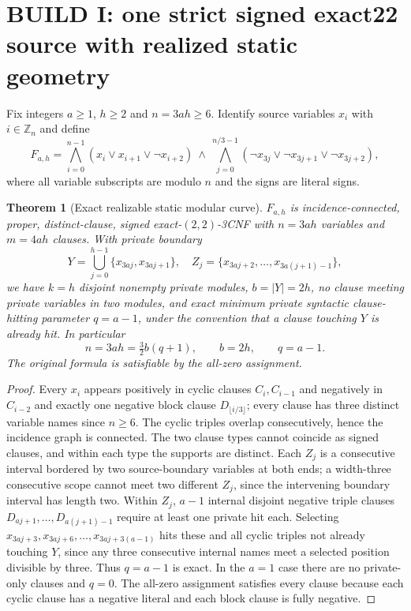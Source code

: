 \documentclass[10pt]{article}
\newtheorem{theorem}{Theorem}
\begin{document}
\section{BUILD I: one strict signed exact22 source with realized static geometry}
Fix integers $a\ge1$, $h\ge2$ and $n=3ah\ge6$. Identify source variables $x_i$ with $i\in\mathbb Z_n$ and define
\begin{equation}\label{eq:source}
F_{a,h}=\bigwedge_{i=0}^{n-1}(x_i\vee x_{i+1}\vee\neg x_{i+2})\ \wedge\
\bigwedge_{j=0}^{n/3-1}(\neg x_{3j}\vee\neg x_{3j+1}\vee\neg x_{3j+2}),
\end{equation}
where all variable subscripts are modulo $n$ and the signs are literal signs.
\begin{theorem}[Exact realizable static modular curve]\label{thm:static}
$F_{a,h}$ is incidence-connected, proper, distinct-clause, signed exact-$(2,2)$-3CNF with $n=3ah$ variables and $m=4ah$ clauses. With private boundary
\[
 Y=\bigcup_{j=0}^{h-1}\{x_{3aj},x_{3aj+1}\},\quad
 Z_j=\{x_{3aj+2},\ldots,x_{3a(j+1)-1}\},
\]
we have $k=h$ disjoint nonempty private modules, $b=|Y|=2h$, no clause meeting private variables in two modules, and exact minimum private syntactic clause-hitting parameter $q=a-1$, under the convention that a clause touching $Y$ is already hit. In particular
\begin{equation}\label{eq:realizable}
 n=3ah=\tfrac32b(q+1),\qquad b=2h,\qquad q=a-1. 
\end{equation}
The original formula is satisfiable by the all-zero assignment.
\end{theorem}
\begin{proof}
Every $x_i$ appears positively in cyclic clauses $C_i,C_{i-1}$ and negatively in $C_{i-2}$ and exactly one negative block clause $D_{\lfloor i/3\rfloor}$; every clause has three distinct variable names since $n\ge6$. The cyclic triples overlap consecutively, hence the incidence graph is connected. The two clause types cannot coincide as signed clauses, and within each type the supports are distinct. Each $Z_j$ is a consecutive interval bordered by two source-boundary variables at both ends; a width-three consecutive scope cannot meet two different $Z_j$, since the intervening boundary interval has length two. Within $Z_j$, $a-1$ internal disjoint negative triple clauses
$D_{aj+1},\ldots,D_{a(j+1)-1}$ require at least one private hit each. Selecting $x_{3aj+3},x_{3aj+6},\ldots,x_{3aj+3(a-1)}$ hits these and all cyclic triples not already touching $Y$, since any three consecutive internal names meet a selected position divisible by three. Thus $q=a-1$ is exact. In the $a=1$ case there are no private-only clauses and $q=0$. The all-zero assignment satisfies every clause because each cyclic clause has a negative literal and each block clause is fully negative.
\end{proof}
\end{document}
